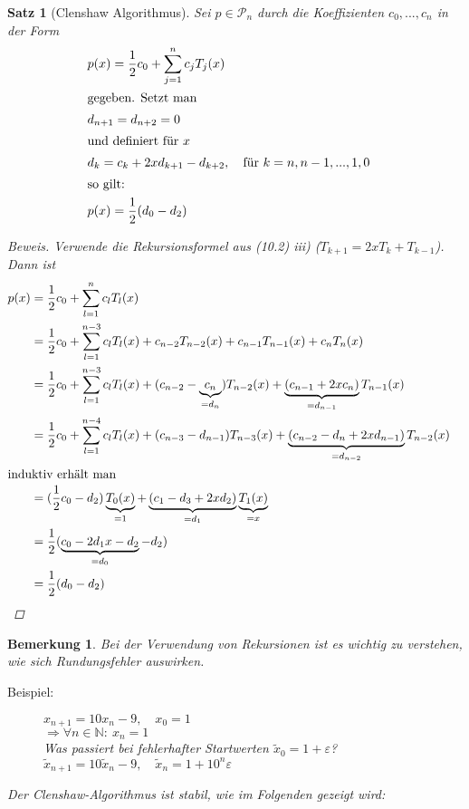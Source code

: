 \documentclass[12pt]{article}
\theoremstyle{break}
\newtheorem{theorem}{Satz}[subsection]
\newtheorem*{comment*}{Bemerkung}
\begin{document}
\begin{theorem}[Clenshaw Algorithmus]
Sei $p \in \mathcal{P}_n$ durch die Koeffizienten $c_0, ..., c_n$ in der Form
\begin{align*}
&p(x) = \frac{1}{2} c_0 + \sum_{j=1}^n c_j T_j(x)&\\
\intertext{gegeben. Setzt man }
&d_{n+1} = d_{n+2} = 0 &\\
\intertext{und definiert für $x$}
&d_k = c_k + 2x d_{k+1} - d_{k+2}, \quad \text{für }k=n,n-1,...,1, 0&\\
\intertext{so gilt:}
&p(x) = \frac{1}{2} (d_0-d_2)&\\
\end{align*}
\begin{proof}[Beweis]
Verwende die Rekursionsformel aus (10.2) iii) ($T_{k+1} = 2x T_k + T_{k-1}$). Dann ist 
\begin{align*}
p(x) &= \frac{1}{2} c_0 + \sum_{l=1}^n c_l T_l(x) &\\
&= \frac{1}{2} c_0 + \sum_{l=1}^{n-3} c_l T_l(x) + c_{n-2} T_{n-2}(x) + c_{n-1} T_{n-1}(x) + c_{n} T_{n}(x) &\\
&= \frac{1}{2} c_0 + \sum_{l=1}^{n-3} c_l T_l(x) + (c_{n-2} - \underbrace{c_n}_{=d_n}) T_{n-2}(x) + \underbrace{(c_{n-1} + 2xc_n)}_{=d_{n-1}} T_{n-1}(x) &\\
&= \frac{1}{2} c_0 + \sum_{l=1}^{n-4} c_l T_l(x) + (c_{n-3} - d_{n-1}) T_{n-3}(x) + \underbrace{(c_{n-2} - d_n + 2xd_{n-1})}_{=d_{n-2}} T_{n-2}(x) &\\
\intertext{induktiv erhält man}
&= (\frac{1}{2} c_0 - d_2) \underbrace{T_0(x)}_{=1} + \underbrace{(c_1 - d_3 + 2xd_2)}_{=d_1} \underbrace{T_1(x)}_{=x} &\\
&= \frac{1}{2} (\underbrace{c_0 - 2d_1x - d_2}_{=d_0} -d_2) &\\
&= \frac{1}{2} (d_0-d_2)
\end{align*}
\end{proof}
\end{theorem}

\begin{comment*}
Bei der Verwendung von Rekursionen ist es wichtig zu verstehen, wie sich Rundungsfehler auswirken. 
\begin{description}
  \item[Beispiel:]
    $x_{n+1} = 10x_n - 9, \quad x_0 = 1$ \\
    $ \Rightarrow \forall n \in \mathbb{N}: \medspace x_n = 1$ \\
    Was passiert bei fehlerhafter Startwerten $\tilde{x}_0 = 1+ \varepsilon$? \\
    $ \tilde{x}_{n+1} = 10 \tilde{x}_n - 9, \quad \tilde{x}_n = 1+ 10^n \varepsilon$
\end{description}
Der Clenshaw-Algorithmus ist stabil, wie im Folgenden gezeigt wird:
\end{comment*}
\end{document}
